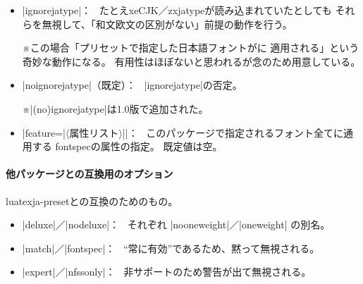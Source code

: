 \documentclass[xelatex,ja=standard,jafont=ipaex,
  a4paper]{bxjsarticle}
\newcommand{\Pkg}[1]{\textsf{#1}}
\newcommand{\Meta}[1]{$\langle$\mbox{}#1\mbox{}$\rangle$}
\newcommand{\Note}{\par\noindent ※}
\newcommand{\Means}{：\ }
\newcommand{\JEmph}{\textgt}
\newcommand{\JSl}{\mbox{／}\linebreak[0]}
\begin{document}
\begin{itemize}
\item |ignorejatype|\Means
たとえ\Pkg{xeCJK}\JSl\Pkg{zxjatype}が読み込まれていたとしても
それらを無視して、「和文欧文の区別がない」前提の動作を行う。
\Note この場合「プリセットで指定した日本語フォントが\JEmph{欧文のみ}に
適用される」という奇妙な動作になる。
有用性はほぼないと思われるが念のため用意している。
\item |noignorejatype|（既定）\Means
|ignorejatype|\>の否定。
\Note |(no)ignorejatype|\>は1.0版で追加された。

\item |feature={|\Meta{属性リスト}|}|\Means
このパッケージで指定されるフォント全てに通用する
\Pkg{fontspec}の属性の指定。
既定値は空。

\end{itemize}

\paragraph{他パッケージとの互換用のオプション}
\Pkg{luatexja-preset}との互換のためのもの。

\begin{itemize}
\item |deluxe|\JSl|nodeluxe|\Means
  それぞれ |nooneweight|\JSl|oneweight| の別名。
\item |match|\JSl|fontspec|\Means
  “常に有効”であるため、黙って無視される。
\item |expert|\JSl|nfssonly|\Means
  非サポートのため警告が出て無視される。
\end{itemize}

\end{document}
